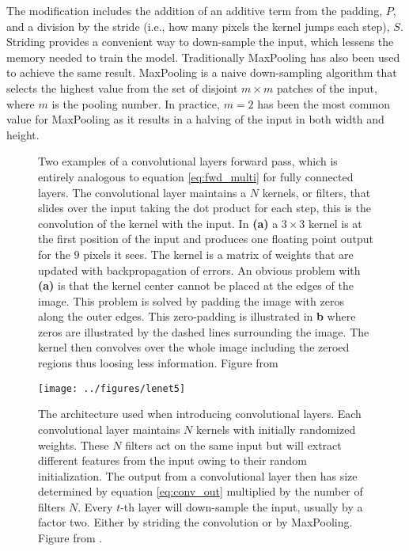 \noindent The modification includes the addition of an additive term from the padding, $P$, and a division by the stride (i.e., how many pixels the kernel jumps each step), $S$. Striding provides a convenient way to down-sample the input, which lessens the memory needed to train the model. Traditionally MaxPooling has also been used to achieve the same result. MaxPooling is a naive down-sampling algorithm that selects the highest value from the set of disjoint $m\times m$ patches of the input, where $m$ is the pooling number. In practice, $m=2$ has been the most common value for MaxPooling as it results in a halving of the input in both width and height.

\begin{figure}
\centering
{}
\caption[Convolutional layer illustration]{Two examples of a convolutional layers forward pass, which is entirely analogous to equation \ref{eq:fwd_multi} for fully connected layers. The convolutional layer maintains a $N$ kernels, or filters, that slides over the input taking the dot product for each step, this is the convolution of the kernel with the input. In \textbf{(a)} a $3\times3$ kernel is at the first position of the input and produces one floating point output for the $9$ pixels it sees. The kernel is a matrix of weights that are updated with backpropagation of errors. An obvious problem with \textbf{(a)} is that the kernel center cannot be placed at the edges of the image. This problem is solved by padding the image with zeros along the outer edges. This zero-padding is illustrated in \textbf{b} where zeros are illustrated by the dashed lines surrounding the image. The kernel then convolves over the whole image including the zeroed regions thus loosing less information. Figure from \citet{Dumoulin2016}}\label{fig:conv_aritmetic} 
\end{figure}

\begin{figure}
\centering
\texttt{[image: ../figures/lenet5]}
\caption[Original LeNet architecture]{The architecture \citet{Lecun1998} used when introducing convolutional layers. Each convolutional layer maintains $N$ kernels with initially randomized weights. These $N$ filters act on the same input but will extract different features from the input owing to their random initialization. The output from a convolutional layer then has size determined by equation \ref{eq:conv_out} multiplied by the number of filters $N$. Every $t$-th layer will down-sample the input, usually by a factor two. Either by striding the convolution or by MaxPooling. Figure from \citet{Lecun1998}.}\label{fig:lenet5}
\end{figure}

